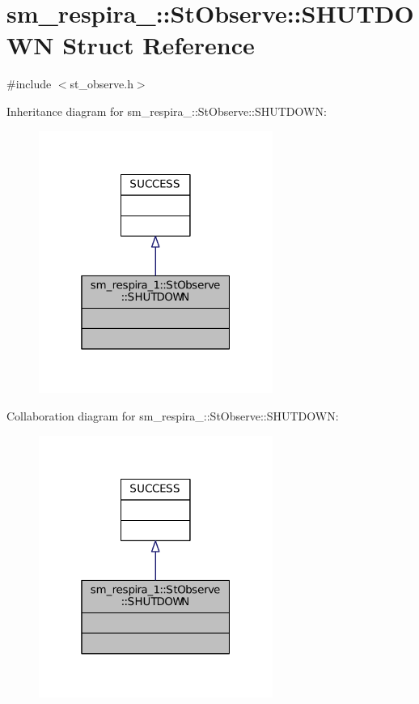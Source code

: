 \hypertarget{structsm__respira__1_1_1StObserve_1_1SHUTDOWN}{}\section{sm\+\_\+respira\+\_\+:\+:St\+Observe\+:\+:S\+H\+U\+T\+D\+O\+WN Struct Reference}
\label{structsm__respira__1_1_1StObserve_1_1SHUTDOWN}


{\ttfamily \#include $<$st\+\_\+observe.\+h$>$}



Inheritance diagram for sm\+\_\+respira\+\_\+:\+:St\+Observe\+:\+:S\+H\+U\+T\+D\+O\+WN\+:
\nopagebreak
\begin{figure}[H]
\begin{center}
\leavevmode
\includegraphics[width=217pt]{structsm__respira__1_1_1StObserve_1_1SHUTDOWN__inherit__graph}
\end{center}
\end{figure}


Collaboration diagram for sm\+\_\+respira\+\_\+:\+:St\+Observe\+:\+:S\+H\+U\+T\+D\+O\+WN\+:
\nopagebreak
\begin{figure}[H]
\begin{center}
\leavevmode
\includegraphics[width=217pt]{structsm__respira__1_1_1StObserve_1_1SHUTDOWN__coll__graph}
\end{center}
\end{figure}


